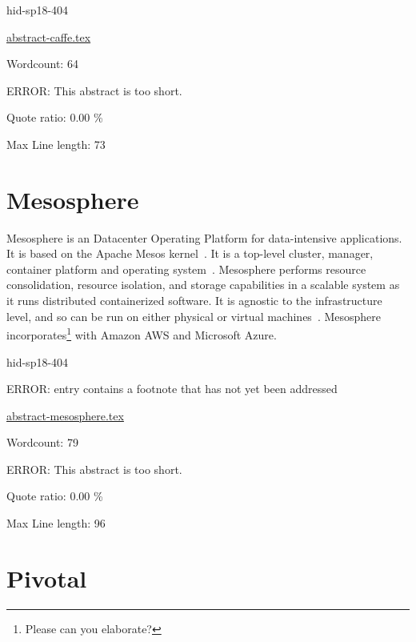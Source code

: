 \begin{IU}

hid-sp18-404

\href{https://github.com/cloudmesh-community/hid-sp18-404/blob/master//technology/abstract-caffe.tex}{abstract-caffe.tex}

 

Wordcount: 64

ERROR: This abstract is too short.


Quote ratio: 0.00 \%
 
Max Line length: 73
\end{IU}

\section{Mesosphere}

Mesosphere is an Datacenter Operating Platform for 
data-intensive applications. It is based on the Apache Mesos 
kernel~\cite{hid-sp18-404-Concepts2018}. It is a top-level 
cluster, manager, container platform and operating system~\cite{hid-sp18-404-Features2018}. 
Mesosphere performs resource consolidation, resource isolation, 
and storage capabilities in a scalable system as it runs distributed 
containerized software. It is agnostic to the infrastructure level, 
and so can be run on either physical or virtual machines~\cite{hid-sp18-404-Architecture2018}. 
Mesosphere incorporates\footnote{Please can you elaborate?} with Amazon AWS and Microsoft Azure.


\begin{IU}

hid-sp18-404

ERROR: entry contains a footnote that has not yet been addressed

\href{https://github.com/cloudmesh-community/hid-sp18-404/blob/master//technology/abstract-mesosphere.tex}{abstract-mesosphere.tex}

 

Wordcount: 79

ERROR: This abstract is too short.


Quote ratio: 0.00 \%
 
Max Line length: 96
\end{IU}

\section{Pivotal}

